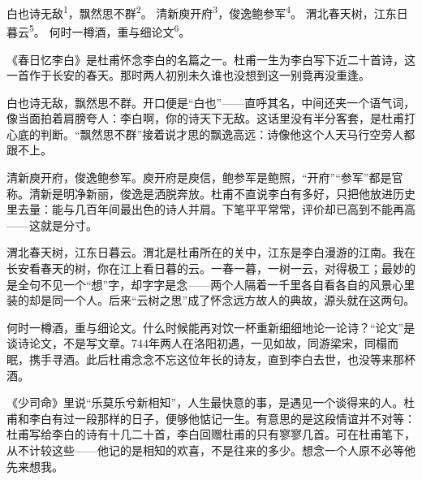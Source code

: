 
\begin{poem}
白也诗无敌\textsuperscript{1}，飘然思不群\textsuperscript{2}。
清新庾开府\textsuperscript{3}，俊逸鲍参军\textsuperscript{4}。
渭北春天树，江东日暮云\textsuperscript{5}。
何时一樽酒，重与细论文\textsuperscript{6}。
\end{poem}

\begin{annotations}
\end{annotations}

\begin{appreciation}
《春日忆李白》是杜甫怀念李白的名篇之一。杜甫一生为李白写下近二十首诗，这一首作于长安的春天。那时两人初别未久谁也没想到这一别竟再没重逢。

白也诗无敌，飘然思不群。开口便是“白也”——直呼其名，中间还夹一个语气词，像当面拍着肩膀夸人：李白啊，你的诗天下无敌。这话里没有半分客套，是杜甫打心底的判断。“飘然思不群”接着说才思的飘逸高远：诗像他这个人天马行空旁人都跟不上。

清新庾开府，俊逸鲍参军。庾开府是庾信，鲍参军是鲍照，“开府”“参军”都是官称。清新是明净新丽，俊逸是洒脱奔放。杜甫不直说李白有多好，只把他放进历史里去量：能与几百年间最出色的诗人并肩。下笔平平常常，评价却已高到不能再高——这就是分寸。

渭北春天树，江东日暮云。渭北是杜甫所在的关中，江东是李白漫游的江南。我在长安看春天的树，你在江上看日暮的云。一春一暮，一树一云，对得极工；最妙的是全句不见一个“想”字，却字字是念——两个人隔着一千里各自看各自的风景心里装的却是同一个人。后来“云树之思”成了怀念远方故人的典故，源头就在这两句。

何时一樽酒，重与细论文。什么时候能再对饮一杯重新细细地论一论诗？“论文”是谈诗论文，不是写文章。744年两人在洛阳初遇，一见如故，同游梁宋，同榻而眠，携手寻酒。此后杜甫念念不忘这位年长的诗友，直到李白去世，也没等来那杯酒。

《少司命》里说“乐莫乐兮新相知”，人生最快意的事，是遇见一个谈得来的人。杜甫和李白有过一段那样的日子，便够他惦记一生。有意思的是这段情谊并不对等：杜甫写给李白的诗有十几二十首，李白回赠杜甫的只有寥寥几首。可在杜甫笔下，从不计较这些——他记的是相知的欢喜，不是往来的多少。想念一个人原不必等他先来想我。
\end{appreciation}
